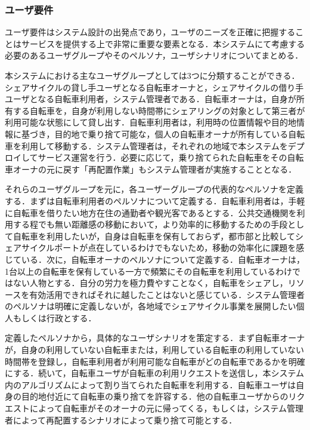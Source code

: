       \subsubsection{ユーザ要件}
        \label{sec:ユーザ要件}
          \par ユーザ要件はシステム設計の出発点であり，ユーザのニーズを正確に把握することはサービスを提供する上で非常に重要な要素となる．本システムにて考慮する必要のあるユーザグループやそのペルソナ，ユーザシナリオについてまとめる．
          \par 本システムにおける主なユーザグループとしては3つに分類することができる．シェアサイクルの貸し手ユーザとなる自転車オーナと，シェアサイクルの借り手ユーザとなる自転車利用者，システム管理者である．自転車オーナは，自身が所有する自転車を，自身が利用しない時間帯にシェアリングの対象として第三者が利用可能な状態にして貸し出す．自転車利用者は，利用時の位置情報や目的地情報に基づき，目的地で乗り捨て可能な，個人の自転車オーナが所有している自転車を利用して移動する．システム管理者は，それぞれの地域で本システムをデプロイしてサービス運営を行う．必要に応じて，乗り捨てられた自転車をその自転車オーナの元に戻す「再配置作業」もシステム管理者が実施することとなる．
          \par それらのユーザグループを元に，各ユーザーグループの代表的なペルソナを定義する．まずは自転車利用者のペルソナについて定義する．自転車利用者は，手軽に自転車を借りたい地方在住の通勤者や観光客であるとする．公共交通機関を利用する程でも無い距離感の移動において，より効率的に移動するための手段として自転車を利用したいが，自身は自転車を保有しておらず，都市部と比較してシェアサイクルポートが点在しているわけでもないため，移動の効率化に課題を感じている．次に，自転車オーナのペルソナについて定義する．自転車オーナは，1台以上の自転車を保有している一方で頻繁にその自転車を利用しているわけではない人物とする．自分の労力を極力費やすことなく，自転車をシェアし，リソースを有効活用できればそれに越したことはないと感じている．システム管理者のペルソナは明確に定義しないが，各地域でシェアサイクル事業を展開したい個人もしくは行政とする．
          \par 定義したペルソナから，具体的なユーザシナリオを策定する．まず自転車オーナが，自身の利用していない自転車または，利用している自転車の利用していない時間帯を登録し，自転車利用者が利用可能な自転車がどの自転車であるかを明確にする．続いて，自転車ユーザが自転車の利用リクエストを送信し，本システム内のアルゴリズムによって割り当てられた自転車を利用する．自転車ユーザは自身の目的地付近にて自転車の乗り捨てを許容する．他の自転車ユーザからのリクエストによって自転車がそのオーナの元に帰ってくる，もしくは，システム管理者によって再配置するシナリオによって乗り捨て可能とする．
          
